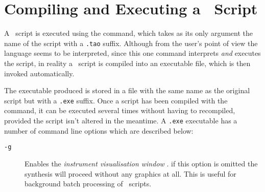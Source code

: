 \section{Compiling and Executing a \tao\ Script}
A \tao\ script is executed using the  command, which takes
as its only argument the name of the script with a \verb|.tao|
suffix. Although from the user's point of view the language seems
to be interpreted, since this one command interprets \emph{and} executes
the script, in reality a \tao\ script is compiled into an executable
file, which is then invoked automatically.  

The executable produced is stored in a file with the same name as the
original script but with a \verb|.exe| suffix. Once a script has been
compiled with the  command, it can be executed several times
without having to recompiled, provided the script isn't altered in the
meantime. A \verb|.exe| executable has a number of command line options
which are described below:

\begin{description}
\item[\texttt{-g}] Enables the 
\emph{instrument visualisation window}
. if this option is
omitted the synthesis will proceed without any graphics at all. This is
useful for background batch processing of \tao\ scripts.
\end{description}






